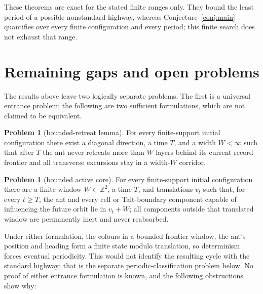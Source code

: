 \documentclass[11pt,reqno]{amsart}
\theoremstyle{plain}
\theoremstyle{definition}
\newtheorem{problem}[theorem]{Problem}
\newcommand{\Z}{\mathbb{Z}}
\begin{document}
These theorems are exact for the stated finite ranges only. They bound the least
period of a possible nonstandard highway, whereas Conjecture~\ref{conj:main}
quantifies over every finite configuration and every period; this finite search
does not exhaust that range.

\section{Remaining gaps and open problems}\label{sec:gap}

The results above leave two logically separate problems. The first is a
universal entrance problem; the following are two sufficient formulations,
which are not claimed to be equivalent.

\begin{problem}[bounded-retreat lemma]\label{prob:retreat}
For every finite-support initial configuration there exist a diagonal direction,
a time $T$, and a width $W<\infty$ such that after $T$ the ant never retreats
more than $W$ layers behind its current record frontier and all transverse
excursions stay in a width-$W$ corridor.
\end{problem}

\begin{problem}[bounded active core]\label{prob:core}
For every finite-support initial configuration there are a finite window
$W\subset\Z^2$, a time $T$, and translations $v_t$ such that, for every $t\ge T$,
the ant and every cell or Tait-boundary component capable of influencing the future
orbit lie in $v_t+W$; all components outside that translated window are permanently
inert and never reabsorbed.
\end{problem}

Under either formulation, the colours in a bounded frontier window, the ant's
position and heading form a finite state modulo translation, so determinism
forces eventual periodicity. This would not identify the resulting cycle with
the standard highway; that is the separate periodic-classification problem
below. No proof of either entrance formulation is known, and the following
obstructions show why:
\end{document}
